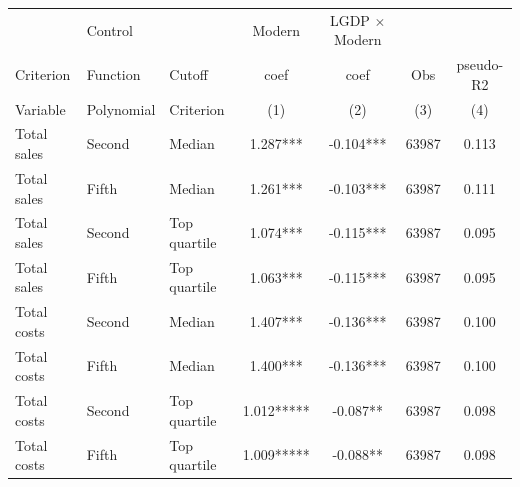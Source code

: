 \begin{tabular}{lllcccc}\hline
           & Control    &           & Modern & LGDP $\times$ Modern &     &           \\
 Criterion & Function   & Cutoff    & coef   & coef                             & Obs & pseudo-R2 \\
 Variable  & Polynomial & Criterion & (1)    & (2)                              & (3) & (4) \\ \hline
Total sales&Second&Median&1.287***&-0.104***&63987&0.113\\
Total sales&Fifth&Median&1.261***&-0.103***&63987&0.111\\
Total sales&Second&Top quartile&1.074***&-0.115***&63987&0.095\\
Total sales&Fifth&Top quartile&1.063***&-0.115***&63987&0.095\\
Total costs&Second&Median&1.407***&-0.136***&63987&0.100\\
Total costs&Fifth&Median&1.400***&-0.136***&63987&0.100\\
Total costs&Second&Top quartile&1.012*****&-0.087**&63987&0.098\\
Total costs&Fifth&Top quartile&1.009*****&-0.088**&63987&0.098\\
\hline
\end{tabular}
